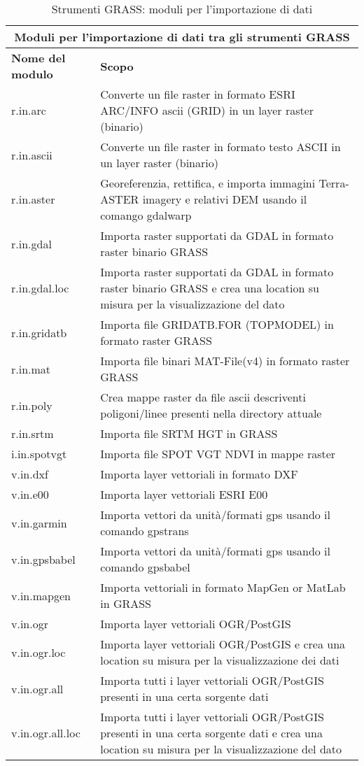 \begin{table}[ht]
\centering
\caption{Strumenti GRASS: moduli per l'importazione di dati}\medskip
 \begin{tabular}{|p{4cm}|p{12cm}|}
  \hline \multicolumn{2}{|c|}{\textbf{Moduli per l'importazione di dati tra gli strumenti GRASS}} \\ 
  \hline \textbf{Nome del modulo} & \textbf{Scopo} \\
  \hline r.in.arc & Converte un file raster in formato ESRI ARC/INFO ascii (GRID) in un layer raster (binario)\\
  \hline r.in.ascii & Converte un file raster in formato testo ASCII in un layer raster (binario) \\
  \hline r.in.aster & Georeferenzia, rettifica, e importa immagini Terra-ASTER imagery e relativi DEM usando il comango gdalwarp \\
  \hline r.in.gdal &  Importa raster supportati da GDAL in formato raster binario GRASS \\
  \hline r.in.gdal.loc &  Importa raster supportati da GDAL in formato raster binario GRASS e crea una location su misura per la visualizzazione del dato \\
  \hline r.in.gridatb & Importa file GRIDATB.FOR (TOPMODEL) in formato raster GRASS \\
  \hline r.in.mat  & Importa file binari MAT-File(v4) in formato raster GRASS  \\
  \hline r.in.poly  &  Crea mappe raster da file ascii descriventi poligoni/linee presenti nella directory attuale \\
  \hline r.in.srtm  & Importa file SRTM HGT in GRASS \\
  \hline i.in.spotvgt & Importa file SPOT VGT NDVI in mappe raster \\
  \hline v.in.dxf & Importa layer vettoriali in formato DXF \\
  \hline v.in.e00 & Importa layer vettoriali ESRI E00 \\
  \hline v.in.garmin & Importa vettori da unità/formati gps usando il comando gpstrans \\
  \hline v.in.gpsbabel & Importa vettori da unità/formati gps usando il comando gpsbabel \\
  \hline v.in.mapgen & Importa vettoriali in formato MapGen or MatLab in GRASS \\
  \hline v.in.ogr & Importa layer vettoriali OGR/PostGIS \\
  \hline v.in.ogr.loc & Importa layer vettoriali OGR/PostGIS e crea una location su misura per la visualizzazione dei dati \\
  \hline v.in.ogr.all & Importa tutti i layer vettoriali OGR/PostGIS presenti in una certa sorgente dati \\
  \hline v.in.ogr.all.loc & Importa tutti i layer vettoriali OGR/PostGIS presenti in una certa sorgente dati e crea una location su misura per la visualizzazione del dato \\
\hline
\end{tabular}
\end{table}

